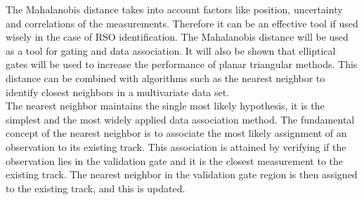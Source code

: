 \documentclass[]{aiaa-tc}%
\begin{document}
The Mahalanobis  distance takes into account factors like position, uncertainty and correlations of the measurements. Therefore it can be an effective tool if used wisely in the case of RSO identification. The Mahalanobis distance will be used as a tool for gating and data association. It will also be shown that elliptical gates will be used to increase the performance of planar triangular methods. This distance can be combined with algorithms such as the nearest neighbor to identify closest neighbors in a multivariate data set.\\

The nearest neighbor maintains the single most likely hypothesis, it is the simplest and the most widely applied data association method. The fundamental concept of the nearest neighbor is to associate the most likely assignment of an observation to its existing track. This association is attained by verifying if the observation lies in the validation gate and it is the closest measurement to the existing track. The nearest neighbor in the validation gate region is then assigned to the existing track, and this is updated.\\
\end{document}
